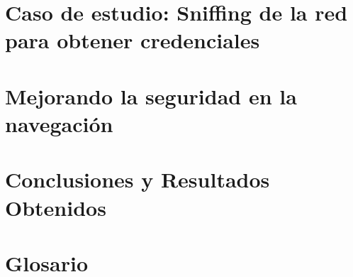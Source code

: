 \documentclass[12pt,twoside]{book}
\begin{document}
\chapter{Caso de estudio: Sniffing de la red para obtener credenciales } 
    \label{capCaseOfStudy}




\chapter{Mejorando la seguridad en la navegación} 
    \label{capImp}







\chapter{Conclusiones y Resultados Obtenidos}
    \label{capConc}




\appendix
\chapter{Glosario}





%
\end{document}
